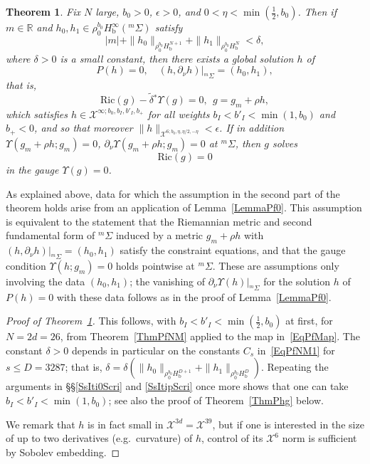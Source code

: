 \documentclass[reqno,11pt,letterpaper]{amsart}
\numberwithin{equation}{section}
\numberwithin{figure}{section}
\newtheorem{thm}{Theorem}[section]
\theoremstyle{definition}
\theoremstyle{remark}
\newcommand{\mc}{\mathcal}
\newcommand{\cX}{\mc X}
\newcommand{\R}{\mathbb{R}}
\newcommand{\Ups}{\Upsilon}
\newcommand{\eps}{\epsilon}
\newcommand{\pa}{\partial}
\newcommand{\wt}{\widetilde}
\newcommand{\bop}{{\mathrm{b}}}
\newcommand{\half}{\tfrac{1}{2}}
\newcommand{\Hb}{H_{\bop}}
\newcommand{\tdel}{\wt{\delta}{}}
\newcommand{\Ric}{\mathrm{Ric}}
\newcommand{\usref}[1]{{\upshape\ref{#1}}}
\begin{document}
\begin{thm}
\label{ThmPf}
  Fix $N$ large, $b_0>0$, $\eps>0$, and $0<\eta<\min(\half,b_0)$. Then if $m\in\R$ and $h_0,h_1\in\rho_0^{b_0}\Hb^\infty({}^m\Sigma)$ satisfy
  \[
    |m|+\|h_0\|_{\rho_0^{b_0}\Hb^{N+1}}+\|h_1\|_{\rho_0^{b_0}\Hb^N}<\delta,
  \]
  where $\delta>0$ is a small constant, then there exists a global solution $h$ of
  \begin{equation}
  \label{EqPfIVP}
    P(h)=0, \quad (h,\pa_\nu h)|_{{}^m\Sigma}=(h_0,h_1),
  \end{equation}
  that is,
  \[
    \Ric(g)-\tdel^*\Ups(g)=0,\ \ g=g_m+\rho h,
  \]
  which satisfies $h\in\cX^{\infty;b_0,b_I,b'_I,b_+}$ for all weights $b_I<b'_I<\min(1,b_0)$ and $b_+<0$, and so that moreover $\|h\|_{\cX^{6;b_0,\eta,\eta/2,-\eta}}<\eps$. If in addition $\Ups(g_m+\rho h;g_m)=0$, $\pa_\nu\Ups(g_m+\rho h;g_m)=0$ at ${}^m\Sigma$, then $g$ solves
  \[
    \Ric(g)=0
  \]
  in the gauge $\Ups(g)=0$.
\end{thm}

As explained above, data for which the assumption in the second part of the theorem holds arise from an application of Lemma~\ref{LemmaPf0}. This assumption is equivalent to the statement that the Riemannian metric and second fundamental form of ${}^m\Sigma$ induced by a metric $g_m+\rho h$ with $(h,\pa_\nu h)|_{{}^m\Sigma}=(h_0,h_1)$ satisfy the constraint equations, and that the gauge condition $\Ups(h;g_m)=0$ holds pointwise at ${}^m\Sigma$. These are assumptions only involving the data $(h_0,h_1)$; the vanishing of $\pa_\nu\Ups(h)|_{{}^m\Sigma}$ for the solution $h$ of $P(h)=0$ with these data follows as in the proof of Lemma~\ref{LemmaPf0}.

\begin{proof}[Proof of Theorem~\usref{ThmPf}]
  This follows, with $b_I<b'_I<\min(\half,b_0)$ at first, for $N=2 d=26$, from Theorem~\ref{ThmPfNM} applied to the map in~\eqref{EqPfMap}. The constant $\delta>0$ depends in particular on the constants $C_s$ in~\eqref{EqPfNM1} for $s\leq D=3287$; that is, $\delta=\delta(\|h_0\|_{\rho_0^{b_0}\Hb^{D+1}}+\|h_1\|_{\rho_0^{b_0}\Hb^D})$. Repeating the arguments in \S\S\ref{SsIti0Scri} and \ref{SsItipScri} once more shows that one can take $b_I<b'_I<\min(1,b_0)$; see also the proof of Theorem~\ref{ThmPhg} below.
  
  We remark that $h$ is in fact small in $\cX^{3 d}=\cX^{39}$, but if one is interested in the size of up to two derivatives (e.g.\ curvature) of $h$, control of its $\cX^6$ norm is sufficient by Sobolev embedding.
\end{proof}
\end{document}
